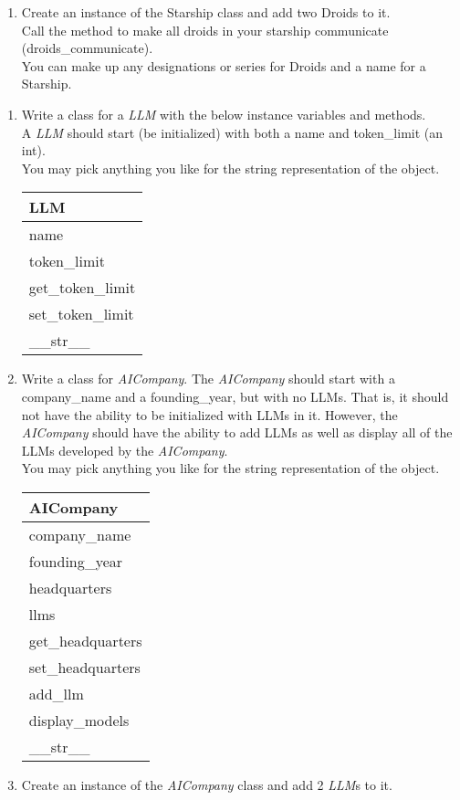 \begin{enumerate}
		\item
			Create an instance of the Starship class and add two Droids to it.\\
			Call the method to make all droids in your starship communicate (droids\_communicate).\\
			You can make up any designations or series for Droids and a name for a Starship.\\
	\end{enumerate}
\pagebreak


	\item 
	\begin{enumerate}
		\item 
			Write a class for a \textit{LLM} with the below instance variables and methods.\\
			A \textit{LLM} should start (be initialized) with both a name and token\_limit (an int).\\
			You may pick anything you like for the string representation of the object.
			\begin{flushright}
			\begin{tabular}{|l|} \hline
				LLM\\ \hline
				name\\ token\_limit\\ \hline
				get\_token\_limit \\ set\_token\_limit \\ \_\_str\_\_ \\ \hline
			\end{tabular}
			\end{flushright}
		
		\item 
			Write a class for \textit{AICompany}. The \textit{AICompany} should start
			with a company\_name and a founding\_year, but with no LLMs. That is, it should
			not have the ability to be initialized with LLMs in it. However, the
			\textit{AICompany} should have the ability to add LLMs as well as display all of the
			LLMs developed by the \textit{AICompany}.\\
			You may pick anything you like for the string representation of the object.
			\begin{flushright}
			\begin{tabular}{|l|} \hline 
				AICompany\\ \hline
				company\_name\\ founding\_year \\ headquarters \\ llms\\ \hline
				get\_headquarters\\ set\_headquarters\\ add\_llm\\ display\_models\\ 
					\_\_str\_\_ \\ \hline
			\end{tabular}
			\end{flushright}

		\item
			Create an instance of the \textit{AICompany} class and add 2 \textit{LLM}s to it.
	\end{enumerate}

